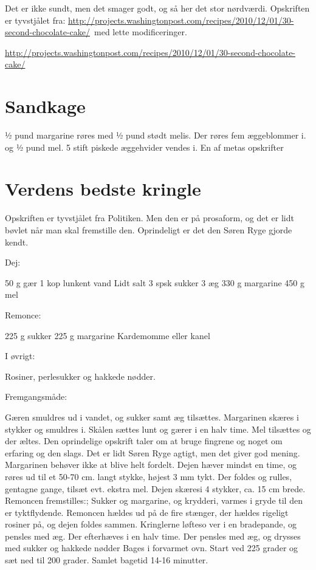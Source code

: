 \documentclass[
]{book}
\begin{document}
Det er ikke sundt, men det smager godt, og så her det stor nørdværdi. Opskriften er tyvstjålet fra: \url{http://projects.washingtonpost.com/recipes/2010/12/01/30-second-chocolate-cake/}~med lette modificeringer.

\url{http://projects.washingtonpost.com/recipes/2010/12/01/30-second-chocolate-cake/}

\section{Sandkage}\label{sandkage}

½ pund margarine røres med ½ pund stødt melis. Der røres fem æggeblommer i. og ½ pund mel. 5 stift piskede æggehvider vendes i.
En af metas opskrifter

\section{Verdens bedste kringle}\label{verdens-bedste-kringle}

Opskriften er tyvstjålet fra Politiken. Men den er på prosaform, og det er lidt bøvlet når man skal fremstille den.
Oprindeligt er det den Søren Ryge gjorde kendt.

Dej:

50 g gær
1 kop lunkent vand
Lidt salt
3 spsk sukker
3 æg
330 g margarine
450 g mel

Remonce:

225 g sukker
225 g margarine
Kardemomme eller kanel

I øvrigt:

Rosiner, perlesukker og hakkede nødder.

Fremgangsmåde:

Gæren smuldres ud i vandet, og sukker samt æg tilsættes. Margarinen skæres i stykker og smuldres i. Skålen sættes lunt og gærer i en halv time.
Mel tilsættes og der æltes. Den oprindelige opskrift taler om at bruge fingrene og noget om erfaring og den slags. Det er lidt Søren Ryge agtigt, men det giver god mening. Margarinen behøver ikke at blive helt fordelt.
Dejen hæver mindst en time, og røres ud til et 50-70 cm. langt stykke, højest 3 mm tykt. Der foldes og rulles, gentagne gange, tilsæt evt. ekstra mel. Dejen skæresi 4 stykker, ca. 15 cm brede.
Remoncen fremstilles:; Sukker og margarine, og krydderi, varmes i gryde til den er tyktflydende.
Remoncen hældes ud på de fire stænger, der hældes rigeligt rosiner på, og dejen foldes sammen.
Kringlerne løfteso ver i en bradepande, og pensles med æg. Der efterhæves i en halv time.
Der pensles med æg, og drysses med sukker og hakkede nødder
Bages i forvarmet ovn. Start ved 225 grader og sæt ned til 200 grader. Samlet bagetid 14-16 minutter.
\end{document}
